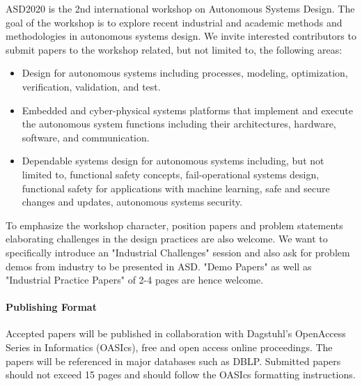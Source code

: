 \documentclass[a4paper,10pt] {article}
\begin{document}
ASD2020 is the 2nd international workshop on Autonomous Systems Design. The goal of the workshop is to explore recent industrial and academic methods and methodologies in autonomous systems design. We invite interested contributors to submit papers to the workshop related, but not limited to, the following areas: 
\begin{itemize} [noitemsep]
\item Design for autonomous systems including processes, modeling, optimization, verification, validation, and test.
\item Embedded and cyber-physical systems platforms that implement and execute the autonomous system functions including their architectures, hardware, software, and communication.
\item Dependable systems design for autonomous systems including, but not limited to, functional safety concepts, fail-operational systems design, functional safety for applications with machine learning, safe and secure changes and updates, autonomous systems security. 
\end{itemize}
To emphasize the workshop character, position papers and problem statements elaborating challenges in the design practices are also welcome. We want to specifically introduce an "Industrial Challenges" session and also ask for problem demos from industry to be presented in ASD.
"Demo Papers" as well as "Industrial Practice Papers" of 2-4 pages are hence welcome.

%
\vspace{-0.2cm}
\paragraph{Publishing Format}
Accepted papers will be published in collaboration with  Dagstuhl's OpenAccess Series in Informatics %
(OASIcs), free and open access online proceedings. The papers will be referenced in major databases such as DBLP. %
Submitted papers should not exceed 15 pages and should follow the OASIcs formatting instructions. %
\vspace{-0.2cm}
\end{document}
